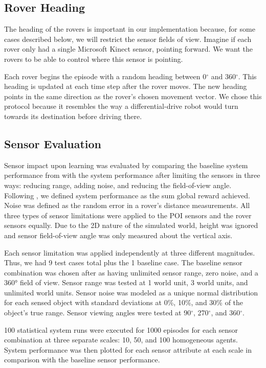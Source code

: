 \documentclass[letterpaper, 10 pt, conference]{ieeeconf}  %
\begin{document}
\subsection{Rover Heading}
The heading of the rovers is important in our implementation because, for some cases described below, we will restrict the sensor fields of view. Imagine if each rover only had a single Microsoft Kinect sensor, pointing forward. We want the rovers to be able to control where this sensor is pointing. 

Each rover begins the episode with a random heading between 0$^{\circ}$ and 360$^{\circ}$. This heading is updated at each time step after the rover moves. The new heading points in the same direction as the rover's chosen movement vector. We chose this protocol because it resembles the way a differential-drive robot would turn towards its destination before driving there. 

\subsection{Sensor Evaluation}
Sensor impact upon learning was evaluated by comparing the baseline
system performance from \cite{agogino2008analyzing} with the system performance after limiting
the sensors in three ways: reducing range, adding noise, and reducing
the field-of-view angle.  Following \cite{agogino2008analyzing}, we defined system performance
as the sum global reward achieved.  Noise was defined as the random
error in a rover’s distance measurements. All three types of sensor
limitations were applied to the POI sensors and the rover sensors
equally. Due to the 2D nature of the simulated world, height was
ignored and sensor field-of-view angle was only measured about the
vertical axis.

Each sensor limitation was applied independently at three different
magnitudes.  Thus, we had 9 test cases total plus the 1 baseline
case. The baseline sensor combination was chosen after \cite{agogino2008analyzing} as having
unlimited sensor range, zero noise, and a 360° field of view. Sensor
range was tested at 1 world unit, 3 world units, and unlimited world
units. Sensor noise was modeled as a unique normal distribution for
each sensed object with standard deviations at 0\%, 10\%, and 30\% of the
object’s true range. Sensor viewing angles were tested at 90$^{\circ}$, 270$^{\circ}$,
and 360$^{\circ}$.

100 statistical system runs were executed for 1000 episodes for each
sensor combination at three separate scales: 10, 50, and 100
homogeneous agents.  System performance was then plotted for each
sensor attribute at each scale in comparison with the baseline sensor
performance.
\end{document}
